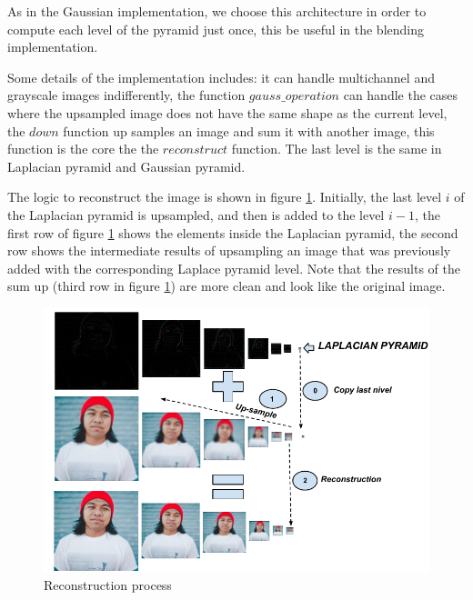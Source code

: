 As in the Gaussian implementation, we choose this architecture in order to compute each level of the pyramid just once, this be useful in the blending implementation.

Some details of the implementation includes: it can handle multichannel and grayscale images indifferently, the function  $gauss\_operation$ can handle the cases where the upsampled image does not have the same shape as the current level, the $down$ function up samples an image and sum it with another image, this function is the core the the $reconstruct$ function. The last level is the same in Laplacian pyramid and Gaussian pyramid.

The logic to reconstruct the image is shown in figure \ref{fig:reconstruction-laplace}. Initially, the last level $i$ of the Laplacian pyramid is upsampled, and then is added to the level $i-1$, the first row of figure \ref{fig:reconstruction-laplace} shows the elements inside the Laplacian pyramid, the second row shows the intermediate results of upsampling an image that was previously added with the corresponding Laplace pyramid level. Note that the results of the sum up (third row in figure \ref{fig:reconstruction-laplace}) are more clean and look like the original image.

\begin{figure}[h!]
\hspace{-1cm}
  \includegraphics[width=1.1\linewidth]{output/reconstructionImage.pdf}
  \caption{Reconstruction process}
\label{fig:reconstruction-laplace}
\end{figure}
